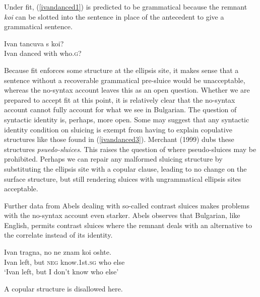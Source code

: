 \documentclass{turabian-researchpaper}
\begin{document}
Under fit, (\ref{ivandanced1}) is predicted to be grammatical because the remnant \textit{koi} can be slotted into the sentence in place of the antecedent to give a grammatical sentence. 

\begin{exe}
\ex\label{ivandanced6}
\gll Ivan tancuva s      koi? \\ 
 Ivan danced   with who.\textsc{g}? \\
 \end{exe}
 
Because fit enforces some structure at the ellipsis site, it makes sense that a sentence without a recoverable grammatical pre-sluice would be unacceptable, whereas the no-syntax account leaves this as an open question. Whether we are prepared to accept fit at this point, it is relatively clear that the no-syntax account cannot fully account for what we see in Bulgarian. The question of syntactic identity is, perhaps, more open. Some may suggest that any syntactic identity condition on sluicing is exempt from having to explain copulative structures like those found in (\ref{ivandanced3}). Merchant (1999) dubs these structures \textit{psuedo-sluices}. This raises the question of where pseudo-sluices may be prohibited. Perhaps we can repair any malformed sluicing structure by substituting the ellipsis site with a copular clause, leading to no change on the surface structure, but still rendering sluices with ungrammatical ellipsis sites acceptable. 

Further data from Abels dealing with so-called contrast sluices makes problems with the no-syntax account even starker. Abels observes that Bulgarian, like English, permits contrast sluices where the remnant deals with an alternative to the correlate instead of its identity. 
\begin{exe}
\ex\label{ivanleft1}
\gll Ivan tragna, no ne znam koi oshte.  \\
Ivan left, but \textsc{neg} know.1st.\textsc{sg} who else \\
\trans `Ivan left, but I don't know who else'
\end{exe}

\noindent A copular structure is disallowed here. 

\begin{exe} 
\ex
\begin{xlist} 
\end{xlist}
\end{exe}
\end{document}
